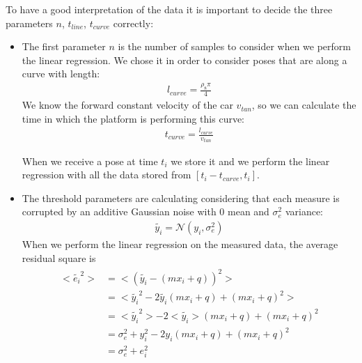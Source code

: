 To have a good interpretation of the data it is important to decide the three parameters $n$, $t_{line}$, $t_{curve}$ correctly:
\begin{itemize}
\item The first parameter $n$ is the number of samples to consider when we perform the linear regression. We chose it in order to consider poses that are along a curve with length:
\begin{align}
l_{curve} = \frac{\rho_8\pi}{4} \label{eq:lengthcurve} 
\end{align}
We know the forward constant velocity of the car $v_{tan}$, so we can calculate the time in which the platform is performing this curve:
\begin{align}
t_{curve} = \frac{l_{curve}}{v_{tan}} \label{eq:timecurve} 
\end{align}

When we receive a pose at time $t_i$ we store it and we perform the linear regression with all the data stored from $[t_i-t_{curve},t_i]$.

\item The threshold parameters are calculating considering that each measure is corrupted by an additive Gaussian noise with 0 mean and $\sigma_e^2$ variance: 
\begin{align}
\tilde{y_i} = \mathcal{N}(y_i,\sigma_e^2) 
\end{align}
When we perform the linear regression on the measured data, the average residual square is 
\begin{align}
\begin{split}
<\tilde{e_i}^2> &= <(\tilde{y_i} - (mx_i + q))^2>  \\[5pt]
&= <\tilde{y_i}^2 - 2\tilde{y_i}(mx_i + q) + (mx_i + q)^2>  \\[5pt]
&= <\tilde{y_i}^2> - 2<\tilde{y_i}>(mx_i + q) + (mx_i + q)^2 \\[5pt]
&=  \sigma_e^2 + y_i^2  - 2y_i(mx_i + q) + (mx_i + q)^2  \\[5pt]
&=  \sigma_e^2 + e_i^2 
\end{split}
\end{align}


\end{itemize}
